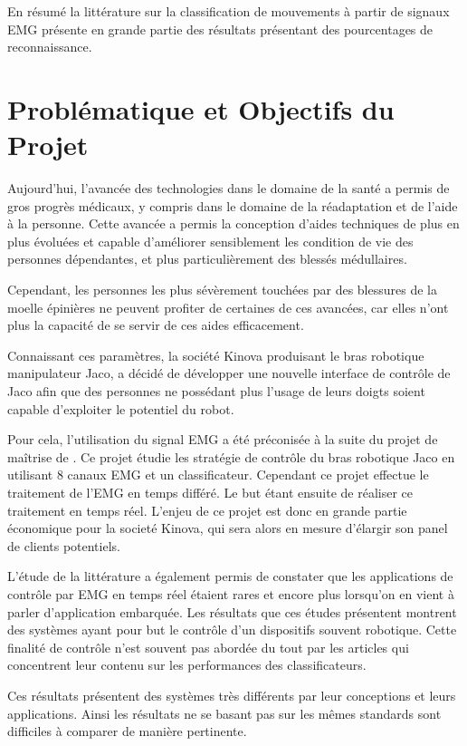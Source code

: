 \documentclass[letterpaper, twoside, 12pt, memoire, creativecommons, hyperref]{thETS}
\begin{document}
En résumé la littérature sur la classification de mouvements à partir de signaux EMG présente en grande partie des résultats présentant des pourcentages de reconnaissance.

\chapter{Problématique et Objectifs du Projet}

Aujourd'hui, l'avancée des technologies dans le domaine de la santé a permis de gros progrès médicaux, y compris dans le domaine de la réadaptation et de l'aide à la personne. Cette avancée a permis la conception d'aides techniques de plus en plus évoluées et capable d'améliorer sensiblement les condition de vie des personnes dépendantes, et plus particulièrement des blessés médullaires. 

Cependant, les personnes les plus sévèrement touchées par des blessures de la moelle épinières ne peuvent profiter de certaines de ces avancées, car elles n'ont plus la capacité de se servir de ces aides efficacement. 

Connaissant ces paramètres, la société Kinova produisant le bras robotique manipulateur Jaco, a décidé de développer une nouvelle interface de contrôle de Jaco afin que des personnes ne possédant plus l'usage de leurs doigts soient capable d'exploiter le potentiel du robot.

Pour cela, l'utilisation du signal EMG a été préconisée à la suite du projet de maîtrise de \cite{Maheu2011}. Ce projet étudie les stratégie de contrôle du bras robotique Jaco en utilisant 8 canaux EMG et un classificateur. Cependant ce projet effectue le traitement de l'EMG en temps différé. Le but étant ensuite de réaliser ce traitement en temps réel. L'enjeu de ce projet est donc en grande partie économique pour la societé Kinova, qui sera alors en mesure d'élargir son panel de clients potentiels.

L'étude de la littérature a également permis de constater que les applications de contrôle par EMG en temps réel étaient rares et encore plus lorsqu'on en vient à parler d'application embarquée. Les résultats que ces études présentent montrent des systèmes ayant pour but le contrôle d'un dispositifs souvent robotique. Cette finalité de contrôle n'est souvent pas abordée du tout par les articles qui concentrent leur contenu sur les performances des classificateurs. 

Ces résultats présentent des systèmes très différents par leur conceptions et leurs applications. Ainsi les résultats ne se basant pas sur les mêmes standards sont difficiles à comparer de manière pertinente.
\end{document}
